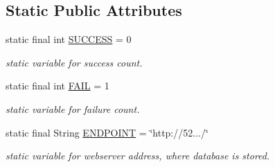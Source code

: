 \subsection*{Static Public Attributes}
\begin{DoxyCompactItemize}
\item 
static final int \hyperlink{classcom_1_1example_1_1sel_1_1lostfound_1_1ScriptRunner_ab5640c236831150ebbea5bf43f3ee3b9}{S\+U\+C\+C\+E\+SS} = 0\hypertarget{classcom_1_1example_1_1sel_1_1lostfound_1_1ScriptRunner_ab5640c236831150ebbea5bf43f3ee3b9}{}\label{classcom_1_1example_1_1sel_1_1lostfound_1_1ScriptRunner_ab5640c236831150ebbea5bf43f3ee3b9}

\begin{DoxyCompactList}\small\item\em static variable for success count. \end{DoxyCompactList}\item 
static final int \hyperlink{classcom_1_1example_1_1sel_1_1lostfound_1_1ScriptRunner_a94833087c5aa3fd8be077df794799ce8}{F\+A\+IL} = 1\hypertarget{classcom_1_1example_1_1sel_1_1lostfound_1_1ScriptRunner_a94833087c5aa3fd8be077df794799ce8}{}\label{classcom_1_1example_1_1sel_1_1lostfound_1_1ScriptRunner_a94833087c5aa3fd8be077df794799ce8}

\begin{DoxyCompactList}\small\item\em static variable for failure count. \end{DoxyCompactList}\item 
static final String \hyperlink{classcom_1_1example_1_1sel_1_1lostfound_1_1ScriptRunner_a6f3af664c21c8bc23d8299c73cd16b46}{E\+N\+D\+P\+O\+I\+NT} = \char`\"{}http\+://52.../\char`\"{}\hypertarget{classcom_1_1example_1_1sel_1_1lostfound_1_1ScriptRunner_a6f3af664c21c8bc23d8299c73cd16b46}{}\label{classcom_1_1example_1_1sel_1_1lostfound_1_1ScriptRunner_a6f3af664c21c8bc23d8299c73cd16b46}

\begin{DoxyCompactList}\small\item\em static variable for webserver address, where database is stored. \end{DoxyCompactList}\end{DoxyCompactItemize}
